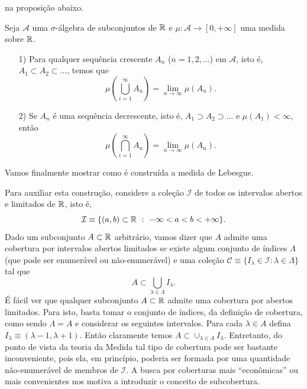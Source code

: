         na proposição abaixo.
        \begin{proposicao}
        \label{prop-cont-medida}
            Seja $\mathcal{A}$ uma $\sigma$-álgebra de subconjuntos de $\mathbb{R}$ e 
            $\mu:\mathcal{A}\to [0,+\infty]$ uma medida sobre $\mathbb{R}$. 
            \begin{itemize}
                \item[1)] Para qualquer sequência crescente $A_n$
                ($n=1,2,\ldots$) em $\mathcal{A}$, isto é,  
                $A_1\subset A_2\subset\ldots$, temos que 
                \[
                  \mu\left(\bigcup_{i=1}^{\infty} A_n \right) = 
                  \lim_{n\to\infty} \mu(A_n).
                \]
                
                \item[2)] Se $A_n$ é uma sequência decrescente, isto é, 
                $A_1\supset A_2\supset\ldots$ e $\mu(A_1)<\infty$, então 
                \[
                    \mu\left(\bigcap_{i=1}^{\infty} A_n \right) = 
                    \lim_{n\to\infty} \mu(A_n).
                \] 
            \end{itemize}
        \end{proposicao}
        \bigskip 
        Vamos finalmente mostrar como é construída a medida 
        de Lebesgue. 
        
        Para auxiliar esta construção, considere a coleção
        $\mathcal{I}$ de todos os intervalos abertos e limitados de $\mathbb{R}$, isto é,
        \[
            \mathcal{I}
            \equiv
            \{(a,b)\subset \mathbb{R}\ :\  -\infty< a<b<+\infty\}.
        \]
        Dado um subconjunto $A\subset \mathbb{R}$ 
        arbitrário, vamos dizer que $A$ admite uma cobertura por
        intervalos abertos limitados se existe algum conjunto 
        de índices $\Lambda$ (que pode ser enumerável ou não-enumerável) 
        e uma coleção 
        $\mathscr{C}\equiv \{ I_{\lambda} \in \mathcal{I}: \lambda\in \Lambda\}$ 
        tal que
        \[
            A\subset \bigcup_{\lambda\in \Lambda} I_{\lambda}.
        \]
        É fácil ver que qualquer subconjunto $A\subset\mathbb{R}$ 
        admite uma cobertura por abertos limitados. Para isto, basta tomar
        o conjunto de índices, da definição de cobertura, como sendo $\Lambda = A$ e considerar os 
        seguintes intervalos. Para cada 
        $\lambda\in A$ defina $I_{\lambda}\equiv (\lambda-1,\lambda+1)$. 
        Então claramente temos $A\subset \cup_{\lambda\in\Lambda} I_{\lambda}$.
        Entretanto, do ponto de vista da teoria da Medida tal tipo de 
        cobertura pode ser bastante inconveniente, pois
        ela, em princípio, poderia ser formada por uma quantidade 
        não-enumerável de membros de $\mathcal{I}$. 
        A busca por coberturas mais ``econômicas'' ou mais 
        convenientes nos motiva a introduzir o conceito de subcobertura.
        
